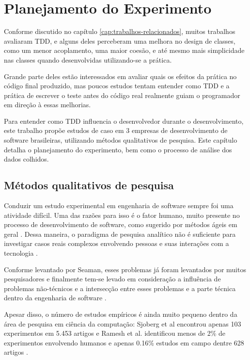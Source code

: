 \chapter{Planejamento do Experimento}
\label{cap:planejamento}

Conforme discutido no capítulo \ref{cap:trabalhos-relacionados}, muitos 
trabalhos avaliaram TDD, e alguns deles perceberam uma melhora
no design de classes, como um menor 
acoplamento, uma maior coesão, e até mesmo mais simplicidade nas classes quando
desenvolvidas utilizando-se a prática. 

Grande parte deles estão interessados em avaliar quais os efeitos da prática
no código final produzido, mas poucos estudos tentam entender como TDD e a
prática de escrever o teste antes do código real realmente guiam o programador 
em direção à essas melhorias.

Para entender como TDD influencia o desenvolvedor durante o desenvolvimento,
este trabalho propõe estudos de caso em 3 empresas de desenvolvimento de
software brasileiras, utilizando métodos qualitativos de pesquisa.
Este capítulo detalha o planejamento do experimento, bem como o processo de
análise dos dados colhidos.

\section{Métodos qualitativos de pesquisa} 
\label{sec:planejamento-qualitativa}

Conduzir um estudo experimental em engenharia de software sempre foi uma
atividade difícil. Uma das razões para isso é o fator humano, muito presente 
no processo de desenvolvimento de software, como sugerido por métodos ágeis  em
geral \cite{AgileManifesto}. Dessa maneira, o paradigma de pesquisa analítico 
não é suficiente para investigar casos reais complexos envolvendo pessoas e 
suas interações com a tecnologia \cite{guidelines-case-study}.

Conforme levantado por Seaman, esses problemas já foram levantados por muitos
pesquisadores e finalmente tem-se levado em consideração a influência de
problemas não-técnicos e a intersecção entre esses problemas e a parte técnica
dentro da engenharia de software \cite{seaman}. 

Apesar disso, o número de estudos empíricos é ainda muito pequeno dentro da área
de pesquisa em ciência da computação: Sjoberg et al encontrou apenas 103
experimentos em 5.453 artigos \cite{sjoberg} e Ramesh et al. identificou menos
de 2\% de experimentos envolvendo humanos e apenas 0.16\% estudos em campo 
dentre 628 artigos \cite{ramesh} .


